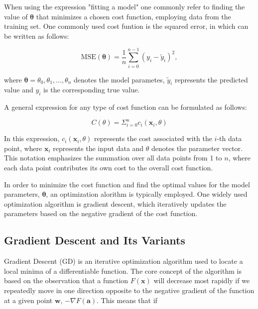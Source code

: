 \documentclass[a4paper, UKenglish, 11pt]{uiomaster}
\begin{document}
When using the expression "fitting a model" one commonly refer to finding the value of $\boldsymbol{\theta}$ that minimizes a chosen cost function, employing data from the training set. One commonly used cost funtion is the squared error, in which can be written as follows:

\begin{equation}
\text{MSE}(\boldsymbol{\theta}) = \frac{1}{n}
\sum_{i=0}^{n-1}(y_i-\tilde{y}_i)^2 ,
\label{eq:MSE}
\end{equation}

where $\boldsymbol{\theta} = \theta_0, \theta_1, ..., \theta_n$ denotes the model parametes, $\tilde{y}_i$ represents the predicted value and $y_i$ is the corresponding true value.

A general expression for any type of cost function can be formulated as follows:

\begin{equation}
C(\theta) = \Sigma^n_{i=0}c_i(\textbf{x}_i, \theta)
\end{equation}

In this expression, $c_i(\textbf{x}_i, \theta)$ represents the cost associated with the $i$-th data point, where $\textbf{x}_i$ represents the input data and $\theta$ denotes the parameter vector. This notation emphasizes the summation over all data points from 1 to $n$, where each data point contributes its own cost to the overall cost function.

In order to minimize the cost function and find the optimal values for the model parameters, $\boldsymbol{\theta}$, an optimization alorithm is typically employed. One widely used optimization algorithm is gradient descent, which iteratively updates the parameters based on the negative gradient of the cost function.

\subsection {Gradient Descent and Its Variants}

Gradient Descent (GD) is an iterative optimization algorithm used to locate a local minima of a differentiable function. The core concept of the algorithm is based on the observation that a function $F(\textbf{x})$ will decrease most rapidly if we repeatedly move in one direction opposite to the negative gradient of the function at a given point $\textbf{w}$, $-\nabla F(\textbf{a})$. This means that if
\end{document}
